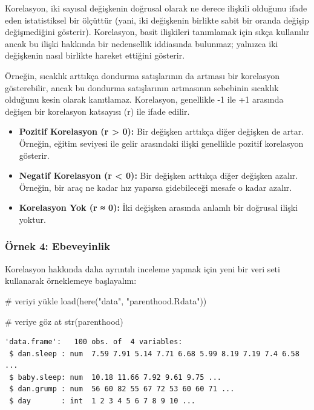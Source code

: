 \documentclass[
  letterpaper,
  DIV=11,
  numbers=noendperiod]{scrartcl}
\newenvironment{Shaded}{\begin{snugshade}}{\end{snugshade}}
\newcommand{\CommentTok}[1]{\textcolor[rgb]{0.37,0.37,0.37}{#1}}
\newcommand{\FunctionTok}[1]{\textcolor[rgb]{0.28,0.35,0.67}{#1}}
\newcommand{\NormalTok}[1]{\textcolor[rgb]{0.00,0.23,0.31}{#1}}
\newcommand{\StringTok}[1]{\textcolor[rgb]{0.13,0.47,0.30}{#1}}
\begin{document}
Korelasyon, iki sayısal değişkenin doğrusal olarak ne derece ilişkili
olduğunu ifade eden istatistiksel bir ölçüttür (yani, iki değişkenin
birlikte sabit bir oranda değişip değişmediğini gösterir). Korelasyon,
basit ilişkileri tanımlamak için sıkça kullanılır ancak bu ilişki
hakkında bir nedensellik iddiasında bulunmaz; yalnızca iki değişkenin
nasıl birlikte hareket ettiğini gösterir.

Örneğin, sıcaklık arttıkça dondurma satışlarının da artması bir
korelasyon gösterebilir, ancak bu dondurma satışlarının artmasının
sebebinin sıcaklık olduğunu kesin olarak kanıtlamaz. Korelasyon,
genellikle -1 ile +1 arasında değişen bir korelasyon katsayısı (r) ile
ifade edilir.

\begin{itemize}
\item
  \textbf{Pozitif Korelasyon (r \textgreater{} 0):} Bir değişken
  arttıkça diğer değişken de artar. Örneğin, eğitim seviyesi ile gelir
  arasındaki ilişki genellikle pozitif korelasyon gösterir.
\item
  \textbf{Negatif Korelasyon (r \textless{} 0):} Bir değişken arttıkça
  diğer değişken azalır. Örneğin, bir araç ne kadar hız yaparsa
  gidebileceği mesafe o kadar azalır.
\item
  \textbf{Korelasyon Yok (r ≈ 0):} İki değişken arasında anlamlı bir
  doğrusal ilişki yoktur.
\end{itemize}

\hypertarget{uxf6rnek-4-ebeveyinlik}{%
\subsubsection{Örnek 4: Ebeveyinlik}\label{uxf6rnek-4-ebeveyinlik}}

Korelasyon hakkında daha ayrıntılı inceleme yapmak için yeni bir veri
seti kullanarak örneklemeye başlayalım:

\begin{Shaded}
\begin{Highlighting}[]
\CommentTok{\# veriyi yükle}
\FunctionTok{load}\NormalTok{(}\FunctionTok{here}\NormalTok{(}\StringTok{"data"}\NormalTok{, }\StringTok{"parenthood.Rdata"}\NormalTok{))}

\CommentTok{\# veriye göz at}
\FunctionTok{str}\NormalTok{(parenthood)}
\end{Highlighting}
\end{Shaded}

\begin{verbatim}
'data.frame':   100 obs. of  4 variables:
 $ dan.sleep : num  7.59 7.91 5.14 7.71 6.68 5.99 8.19 7.19 7.4 6.58 ...
 $ baby.sleep: num  10.18 11.66 7.92 9.61 9.75 ...
 $ dan.grump : num  56 60 82 55 67 72 53 60 60 71 ...
 $ day       : int  1 2 3 4 5 6 7 8 9 10 ...
\end{verbatim}
\end{document}
